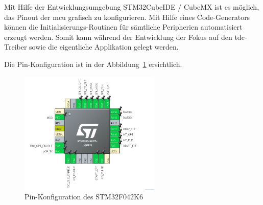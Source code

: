 Mit Hilfe der Entwicklungsumgebung STM32CubeIDE / CubeMX \cite{st2025stm32cubeide} ist es möglich, das Pinout der
\acrshort{mcu} grafisch zu konfigurieren. Mit Hilfe eines Code-Generators können die Initialisierungs-Routinen für
sämtliche Peripherien automatisiert erzeugt werden. Somit kann während der Entwicklung der Fokus auf den \acrshort{tdc}-Treiber
sowie die eigentliche Applikation gelegt werden.

Die Pin-Konfiguration ist in der Abbildung~\ref{fig:pinconfiguration_mcu} ersichtlich.

\begin{figure}[H]
    \centering
    \includegraphics[width=0.6\textwidth]{graphics/pinconfiguration_mcu.png}
    \caption{Pin-Konfiguration des STM32F042K6}\label{fig:pinconfiguration_mcu}
\end{figure}

\pagebreak
